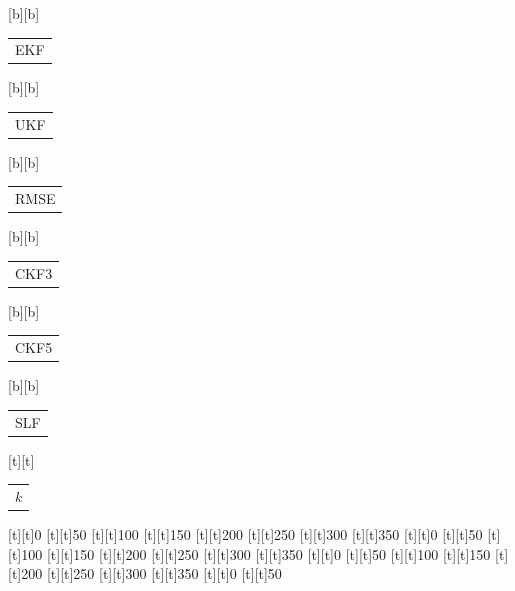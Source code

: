 %    
%
%
\begin{psfrags}%
\psfragscanon%
%
[b][b]{\color[rgb]{0,0,0}\setlength{\tabcolsep}{0pt}\begin{tabular}{c}EKF\end{tabular}}%
[b][b]{\color[rgb]{0,0,0}\setlength{\tabcolsep}{0pt}\begin{tabular}{c}UKF\end{tabular}}%
[b][b]{\color[rgb]{0,0,0}\setlength{\tabcolsep}{0pt}\begin{tabular}{c}RMSE\end{tabular}}%
[b][b]{\color[rgb]{0,0,0}\setlength{\tabcolsep}{0pt}\begin{tabular}{c}CKF3\end{tabular}}%
[b][b]{\color[rgb]{0,0,0}\setlength{\tabcolsep}{0pt}\begin{tabular}{c}CKF5\end{tabular}}%
[b][b]{\color[rgb]{0,0,0}\setlength{\tabcolsep}{0pt}\begin{tabular}{c}SLF\end{tabular}}%
[t][t]{\color[rgb]{0,0,0}\setlength{\tabcolsep}{0pt}\begin{tabular}{c}$k$\end{tabular}}%
%
[t][t]{0}%
[t][t]{50}%
[t][t]{100}%
[t][t]{150}%
[t][t]{200}%
[t][t]{250}%
[t][t]{300}%
[t][t]{350}%
[t][t]{0}%
[t][t]{50}%
[t][t]{100}%
[t][t]{150}%
[t][t]{200}%
[t][t]{250}%
[t][t]{300}%
[t][t]{350}%
[t][t]{0}%
[t][t]{50}%
[t][t]{100}%
[t][t]{150}%
[t][t]{200}%
[t][t]{250}%
[t][t]{300}%
[t][t]{350}%
[t][t]{0}%
[t][t]{50}%

\end{psfrags}
